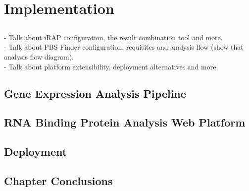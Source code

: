 \chapter{Implementation} \label{chap:implementation}

\section*{}

\begin{Notes}
- Talk about iRAP configuration, the result combination tool and more.\\
- Talk about PBS Finder configuration, requisites and analysis flow (show that analysis flow diagram).\\
- Talk about platform extensibility, deployment alternatives and more.\\
\end{Notes}

\section{Gene Expression Analysis Pipeline}

\section{RNA Binding Protein Analysis Web Platform}

\section{Deployment}

\section{Chapter Conclusions}


